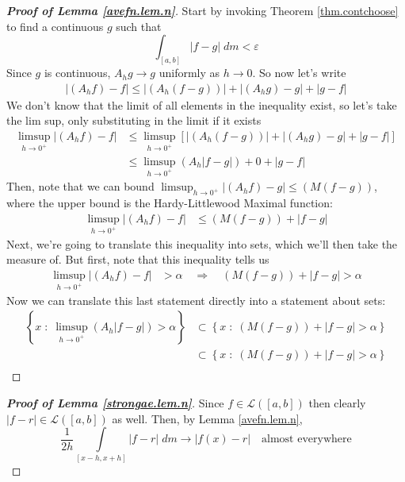 \documentclass[12pt]{article}
\theoremstyle{plain}
\theoremstyle{definition}
\theoremstyle{remark}
\begin{document}
\begin{proof}[\textbf{Proof of Lemma \hyperlink{avefn.lem}{\ref*{avefn.lem.n}}}]
Start by invoking Theorem \ref{thm.contchoose} to find a continuous $g$ such that
\[
    \int_{[a,b]} |f-g|\; dm <\varepsilon 
\]
Since $g$ is continuous, $A_hg\rightarrow g$ uniformly as $h\rightarrow0$. So now let's write
\begin{align*}
    |(A_hf)-f|\leq|(A_h(f-g))|+|(A_hg)-g|+|g-f|
\end{align*}
We don't know that the limit of all elements in the inequality exist, so let's take the lim sup, only substituting in the limit if it exists
\begin{align*}
   \limsup_{h\rightarrow0^+}  
    |(A_hf)-f|&\leq
    \limsup_{h\rightarrow0^+}  
    \left[|(A_h(f-g))|+|(A_hg)-g|+|g-f|\right]\\
    &\leq 
    \limsup_{h\rightarrow0^+} 
    (A_h|f-g|)+0+|g-f|
\end{align*}
Then, note that we can bound $\limsup_{h\rightarrow0^+} |(A_hf)-g|\leq (M(f-g))$, where the upper bound is the Hardy-Littlewood Maximal function: 
\begin{align*}
   \limsup_{h\rightarrow0^+}
    |(A_hf)-f|&\leq
    (M(f-g))+|f-g|
\end{align*}
Next, we're going to translate this inequality into sets, which we'll then take the measure of. But first, note that this inequality tells us 
\begin{align*}
    \limsup_{h\rightarrow0^+}
    |(A_hf)-f|&>\alpha
    \quad\Rightarrow\quad
    (M(f-g))+|f-g|>\alpha
\end{align*}
Now we can translate this last statement directly into a statement about sets:
\begin{align*}
    \left\{x \;:\;\limsup_{h\rightarrow0^+} (A_h|f-g|) > \alpha\right\}
    &\subset 
    \left\{x \;:\;(M(f-g))+|f-g|>\alpha\right\}\\
    &\subset
    \left\{x \;:\;(M(f-g))+|f-g|>\alpha\right\}\\
\end{align*}

\end{proof}

\begin{proof}[\textbf{Proof of Lemma \hyperlink{strongae.lem}{\ref*{strongae.lem.n}}}]
Since $f\in\mathscr{L}([a,b])$ then clearly $|f-r|\in\mathscr{L}([a,b])$ as well. Then, by Lemma \hyperlink{avefn.lem}{\ref*{avefn.lem.n}}, 
\[
    \frac{1}{2h}\int\limits_{[x-h,x+h]} |f-r|\; dm \rightarrow |f(x)-r|
    \quad \text{almost everywhere}
\]
\end{proof}
\end{document}
